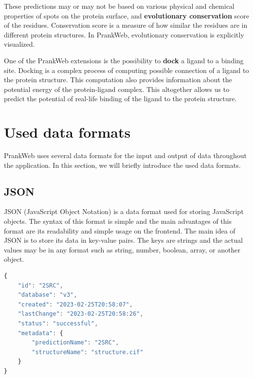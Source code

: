 These predictions may or may not be based on various physical and chemical properties of spots on the protein surface, and \textbf{evolutionary conservation} score of the residues. Conservation score is a measure of how similar the residues are in different protein structures. In PrankWeb, evolutionary conservation is explicitly visualized.

One of the PrankWeb extensions is the possibility to \textbf{dock} a ligand to a binding site. Docking is a complex process of computing possible connection of a ligand to the protein structure. This computation also provides information about the potential energy of the protein-ligand complex. This altogether allows us to predict the potential of real-life binding of the ligand to the protein structure. \cite{sulimov2019advances}



\section{Used data formats}
\label{sec:used_data_formats}

PrankWeb uses several data formats for the input and output of data throughout the application. In this section, we will briefly introduce the used data formats.

\subsection{JSON}
\label{subsec:json}

JSON (JavaScript Object Notation) is a data format used for storing JavaScript objects. The syntax of this format is simple and the main advantages of this format are its readability and simple usage on the frontend. The main idea of JSON is to store its data in key-value pairs. The keys are strings and the actual values may be in any format such as string, number, boolean, array, or another object.

\begin{lstlisting}[language=JavaScript,caption={
    An example of a JSON file used for storing information about the prediction for the 2SRC protein structure.
}]
{
    "id": "2SRC",
    "database": "v3",
    "created": "2023-02-25T20:58:07",
    "lastChange": "2023-02-25T20:58:26",
    "status": "successful",
    "metadata": {
        "predictionName": "2SRC",
        "structureName": "structure.cif"
    }
}
\end{lstlisting}


